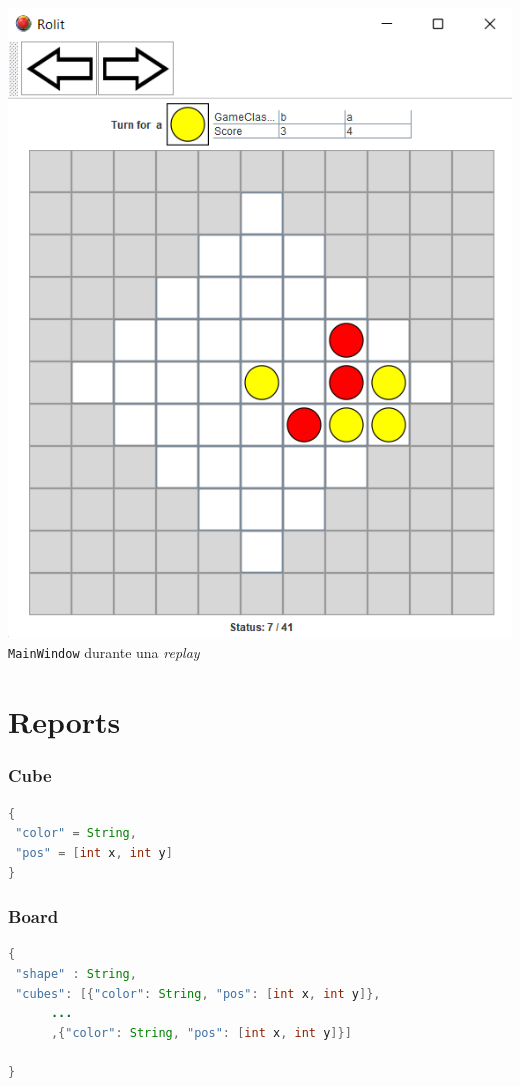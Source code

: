 \documentclass[../DocumentoOficial.tex]{subfiles}
\begin{document}
\begin{center}
\includegraphics[scale=0.7]{replay-sprint-6.png}\\
\texttt{MainWindow} durante una \textit{replay}
\end{center}

\appendix

\chapter{Reports}
\label{ch:Anexo A}
\subsection*{Cube}

\begin{lstlisting}[frame=single, language=Java]
{
 "color" = String,
 "pos" = [int x, int y]
}
\end{lstlisting}

\subsection*{Board}
\begin{lstlisting}[frame=single, language=Java]
{
 "shape" : String,
 "cubes": [{"color": String, "pos": [int x, int y]},
 	  ...
 	  ,{"color": String, "pos": [int x, int y]}]

}
\end{lstlisting}
\end{document}
